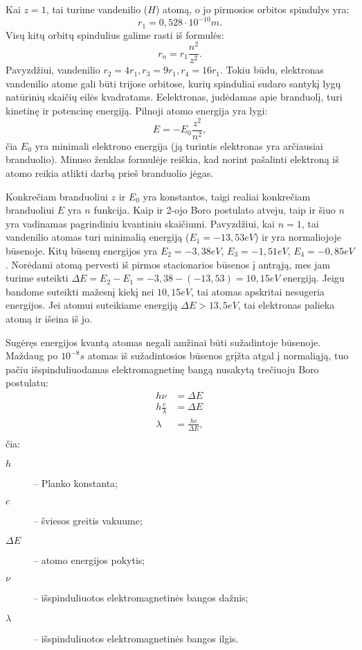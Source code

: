 Kai $z=1$, tai turime vandenilio ($H$) atomą, o jo pirmosios orbitos
spindulys yra:
\begin{equation*}
  r_{1} = 0,528 \cdot 10^{-10} m.
\end{equation*}
Visų kitų orbitų spindulius galime rasti iš formulės:
\begin{equation*}
  r_{n} = r_{1}\frac{n^{2}}{z^{2}}.
\end{equation*}
Pavyzdžiui, vandenilio $r_{2} = 4r_{1}, r_{3} = 9r_{1}, r_{4} = 16r_{1}$.
Tokiu būdu, elektronas vandenilio atome gali būti trijose orbitose,
kurių spinduliai sudaro santykį lygų natūrinių skaičių eilės
kvadratams. Eelektronas, judėdamas apie branduolį, turi kinetinę
ir potencinę energiją. Pilnoji atomo energija yra lygi:
\begin{equation*}
  E = -E_{0} \frac{z^{2}}{n^{2}},
\end{equation*}
čia $E_{0}$ yra minimali elektrono energija (ją turintis elektronas
yra arčiausiai branduolio). Minuso ženklas formulėje
reiškia, kad norint pašalinti elektroną iš atomo reikia atlikti
darbą prieš branduolio jėgas.

Konkrečiam branduoliui $z$ ir $E_{0}$ yra konstantos, taigi realiai
konkrečiam branduoliui $E$ yra $n$ funkcija. Kaip ir 2-ojo Boro
postulato atveju, taip ir šiuo $n$ yra vadinamas pagrindiniu
kvantiniu skaičiumi. Pavyzdžiui, kai $n=1$, tai vandenilio
atomas turi minimalią energiją ($E_{1} = -13,53 eV$) ir yra normaliojoje
būsenoje. Kitų būsenų energijos yra $E_{2} = -3,38eV$, $E_{3} = -1,51eV$,
$E_{4} = -0,85eV$. Norėdami atomą pervesti iš pirmos stacionarios
būsenos į antrąją, mes jam turime suteikti
$\Delta E = E_{2} - E_{1} = -3,38 - (-13,53) = 10,15 eV$ energiją.
Jeigu bandome suteikti mažesnį kiekį nei $10,15eV$, tai atomas
apskritai nesugeria energijos. Jei atomui suteikiame energiją
$\Delta E > 13,5 eV$, tai elektronas palieka atomą ir išeina iš jo.

Sugėręs energijos kvantą atomas negali amžinai būti sužadintoje
būsenoje. Maždaug po $10^{-8}s$ atomas iš sužadintosios būsenos
grįžta atgal į normaliąją, tuo pačiu išspinduliuodamas elektromagnetinę
bangą nusakytą trečiuoju Boro postulatu:
\begin{align*}
  h \nu &= \Delta E \\
  h \frac{c}{\lambda} &= \Delta E \\
  \lambda &= \frac{hc}{\Delta E}, \\
\end{align*}
čia:
\begin{description}
  \item[$h$] – Planko konstanta;
  \item[$c$] – šviesos greitis vakuume;
  \item[$\Delta E$] – atomo energijos pokytis;
  \item[$\nu$] – išspinduliuotos elektromagnetinės bangos dažnis;
  \item[$\lambda$] – išspinduliuotos elektromagnetinės bangos ilgis.
\end{description}

